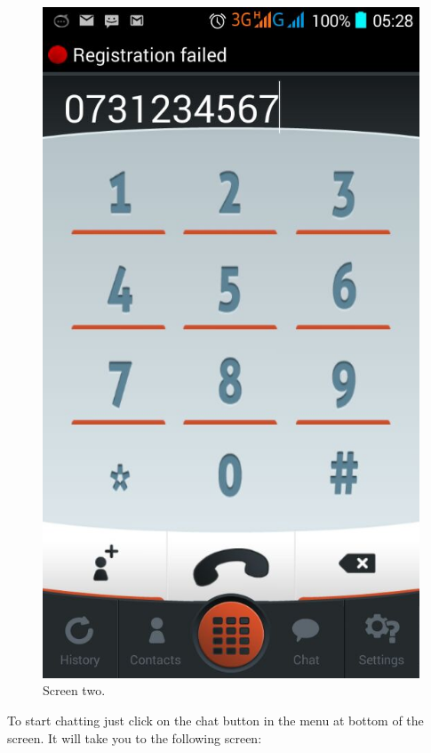 \documentclass[a4paper]{article}
\begin{document}
\begin{center}
\begin{figure}[H]
\centering
\includegraphics[width=0.7\linewidth]{pictures/Screenshot_2015-08-04-05-38-27.png}
\caption{\label{fig:Screen2}Screen two.}
\end{figure}
\end{center}

To start chatting just click on the chat button in the menu at bottom of the screen. It will take you to the following screen:
\end{document}
